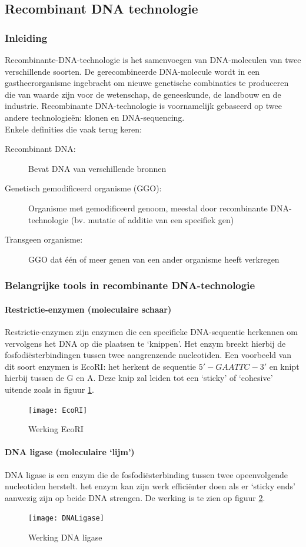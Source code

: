 \documentclass[a4paper,kul]{kulakarticle} %
\begin{document}
\subsection{Recombinant DNA technologie}
\subsubsection{Inleiding}
Recombinante-DNA-technologie is het samenvoegen van DNA-moleculen van twee verschillende soorten. De gerecombineerde DNA-molecule wordt in een gastheerorganisme ingebracht om nieuwe genetische combinaties te produceren die van waarde zijn voor de wetenschap, de geneeskunde, de landbouw en de industrie. Recombinante DNA-technologie is voornamelijk gebaseerd op twee andere technologieën: klonen en DNA-sequencing.\\
Enkele definities die vaak terug keren:
\begin{description}
	\item[Recombinant DNA:] Bevat DNA van verschillende bronnen
	\item[Genetisch gemodificeerd organisme (GGO):] Organisme met gemodificeerd genoom, meestal door recombinante DNA-technologie (bv. mutatie of additie van een specifiek gen)
	\item[Transgeen organisme:] GGO dat één of meer genen van een ander organisme heeft verkregen 
\end{description}
\subsubsection{Belangrijke tools in recombinante DNA-technologie}
\paragraph{Restrictie-enzymen (moleculaire schaar)}
Restrictie-enzymen zijn enzymen die een specifieke DNA-sequentie herkennen om vervolgens het DNA op die plaatsen te `knippen'. Het enzym breekt hierbij de fosfodiësterbindingen tussen twee aangrenzende nucleotiden. Een voorbeeld van dit soort enzymen is EcoRI: het herkent de sequentie $5'-GAATTC-3'$ en knipt hierbij tussen de G en A. Deze knip zal leiden tot een `sticky' of `cohesive' uitende zoals in figuur \ref{fig:ecori}. 
\begin{figure}[h]
	\centering
	\texttt{[image: EcoRI]}
	\caption[EcoRI]{Werking EcoRI}
	\label{fig:ecori}
\end{figure}
\newpage
\paragraph{DNA ligase (moleculaire `lijm')}
DNA ligase is een enzym die de fosfodiësterbinding tussen twee opeenvolgende nucleotiden herstelt. het enzym kan zijn werk efficiënter doen als er `sticky ends' aanwezig zijn op beide DNA strengen. De werking is te zien op figuur \ref{fig:dnaligase}.
\begin{figure}[h]
	\centering
	\texttt{[image: DNALigase]}
	\caption[DNA ligase]{Werking DNA ligase}
	\label{fig:dnaligase}
\end{figure}
\end{document}
